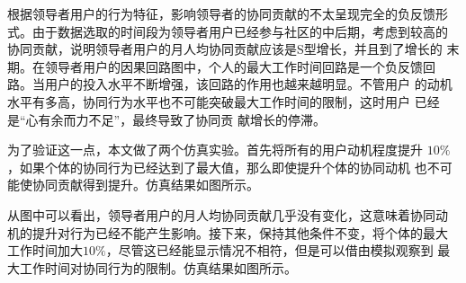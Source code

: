根据领导者用户的行为特征，影响领导者的协同贡献的不太呈现完全的负反馈形
式。由于数据选取的时间段为领导者用户已经参与社区的中后期，考虑到较高的
协同贡献，说明领导者用户的月人均协同贡献应该是S型增长，并且到了增长的
末期。在领导者用户的因果回路图中，个人的最大工作时间回路是一个负反馈回
路。当用户的投入水平不断增强，该回路的作用也越来越明显。不管用户
的动机水平有多高，协同行为水平也不可能突破最大工作时间的限制，这时用户
已经是“心有余而力不足”，最终导致了协同贡
献增长的停滞。

为了验证这一点，本文做了两个仿真实验。首先将所有的用户动机程度提升
$10\%$，如果个体的协同行为已经达到了最大值，那么即使提升个体的协同动机
也不可能使协同贡献得到提升。仿真结果如图所示。

从图中可以看出，领导者用户的月人均协同贡献几乎没有变化，这意味着协同动
机的提升对行为已经不能产生影响。接下来，保持其他条件不变，将个体的最大
工作时间加大$10\%$，尽管这已经能显示情况不相符，但是可以借由模拟观察到
最大工作时间对协同行为的限制。仿真结果如图所示。



